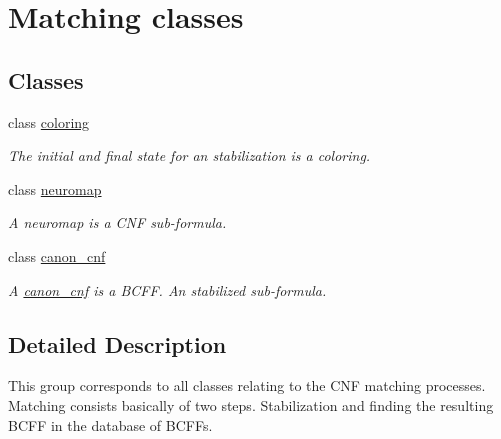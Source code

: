 \hypertarget{group__docgrp__matching__classes}{\section{Matching classes}
\label{group__docgrp__matching__classes}
}
\subsection*{Classes}
\begin{DoxyCompactItemize}
\item 
class \hyperlink{classcoloring}{coloring}
\begin{DoxyCompactList}\small\item\em The initial and final state for an stabilization is a coloring. \end{DoxyCompactList}\item 
class \hyperlink{classneuromap}{neuromap}
\begin{DoxyCompactList}\small\item\em A neuromap is a C\+N\+F sub-\/formula. \end{DoxyCompactList}\item 
class \hyperlink{classcanon__cnf}{canon\+\_\+cnf}
\begin{DoxyCompactList}\small\item\em A \hyperlink{classcanon__cnf}{canon\+\_\+cnf} is a B\+C\+F\+F. An stabilized sub-\/formula. \end{DoxyCompactList}\end{DoxyCompactItemize}


\subsection{Detailed Description}
This group corresponds to all classes relating to the C\+N\+F matching processes. Matching consists basically of two steps. Stabilization and finding the resulting B\+C\+F\+F in the database of B\+C\+F\+Fs. 